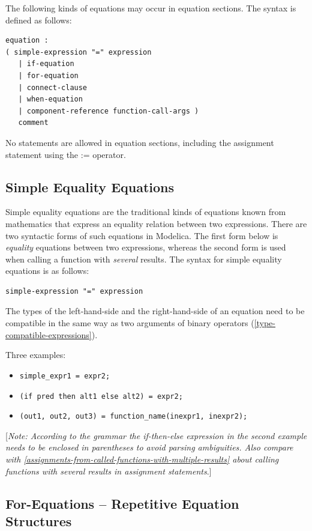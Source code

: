 \documentclass[10pt,a4paper]{report}
\def\doublelabel#1{\label{#1}\hypertarget{#1}{}}
\begin{document}
The following kinds of equations may occur in equation sections. The
syntax is defined as follows:

\begin{lstlisting}[language=grammar]
equation :
( simple-expression "=" expression
   | if-equation
   | for-equation
   | connect-clause
   | when-equation
   | component-reference function-call-args )
   comment
\end{lstlisting}
No statements are allowed in equation sections, including the assignment
statement using the := operator.

\subsection{Simple Equality Equations}\doublelabel{simple-equality-equations}

Simple equality equations are the traditional kinds of equations known
from mathematics that express an equality relation between two
expressions. There are two syntactic forms of such equations in
Modelica. The first form below is \emph{equality} equations between two
expressions, whereas the second form is used when calling a function
with \emph{several} results. The syntax for simple equality equations is
as follows:
\begin{lstlisting}[language=grammar]
simple-expression "=" expression
\end{lstlisting}
The types of the left-hand-side and the right-hand-side of an equation
need to be compatible in the same way as two arguments of binary
operators (\ref{type-compatible-expressions}).

Three examples:

\begin{itemize}
\item \lstinline!simple_expr1 = expr2;!
\item \lstinline!(if pred then alt1 else alt2) = expr2;!
\item \lstinline!(out1, out2, out3) = function_name(inexpr1, inexpr2);!
\end{itemize}

{[}\emph{Note: According to the grammar the if-then-else expression in
the second example needs to be enclosed in parentheses to avoid parsing
ambiguities. Also compare with \ref{assignments-from-called-functions-with-multiple-results} about calling
functions with several results in assignment statements}.{]}

\subsection{For-Equations -- Repetitive Equation Structures}\doublelabel{for-equations-repetitive-equation-structures}
\end{document}
